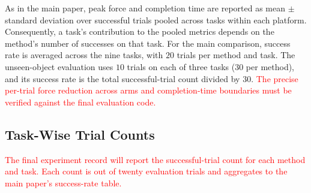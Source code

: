 \documentclass[conference]{IEEEtran}
\newcommand{\assumed}[1]{\textcolor{red}{#1}}
\begin{document}
As in the main paper, peak force and completion time are reported as mean $\pm$ standard deviation over successful trials pooled across tasks within each platform. Consequently, a task's contribution to the pooled metrics depends on the method's number of successes on that task. For the main comparison, success rate is averaged across the nine tasks, with $20$ trials per method and task. The unseen-object evaluation uses $10$ trials on each of three tasks ($30$ per method), and its success rate is the total successful-trial count divided by $30$. \assumed{The precise per-trial force reduction across arms and completion-time boundaries must be verified against the final evaluation code.}

\subsection{Task-Wise Trial Counts}

\assumed{The final experiment record will report the successful-trial count for each method and task. Each count is out of twenty evaluation trials and aggregates to the main paper's success-rate table.}
\end{document}
